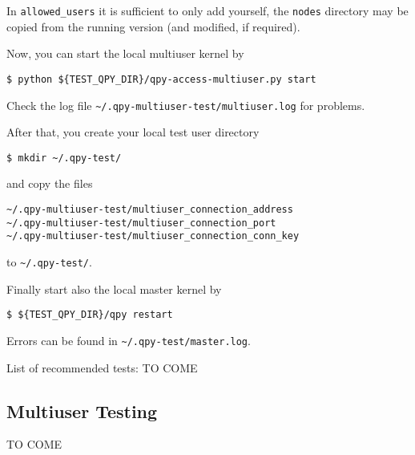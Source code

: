 \documentclass[a4paper,12pt]{article}
\begin{document}
In \verb+allowed_users+ it is sufficient to only add yourself, the \verb+nodes+ directory may be copied from the running version (and modified, if required).

Now, you can start the local multiuser kernel by
\begin{lstlisting}[style=BashStyle]
$ python ${TEST_QPY_DIR}/qpy-access-multiuser.py start
\end{lstlisting}
Check the log file \verb+~/.qpy-multiuser-test/multiuser.log+  for problems.

After that, you create your local test user directory
\begin{lstlisting}[style=BashStyle]
$ mkdir ~/.qpy-test/
\end{lstlisting}
and copy the files
\begin{verbatim}
~/.qpy-multiuser-test/multiuser_connection_address
~/.qpy-multiuser-test/multiuser_connection_port
~/.qpy-multiuser-test/multiuser_connection_conn_key
\end{verbatim}
to \verb+~/.qpy-test/+.

Finally start also the local master kernel by
\begin{lstlisting}[style=BashStyle]
$ ${TEST_QPY_DIR}/qpy restart
\end{lstlisting}
Errors can be found in \verb+~/.qpy-test/master.log+.

List of recommended tests: TO COME


\subsection{Multiuser Testing}

TO COME
\end{document}
